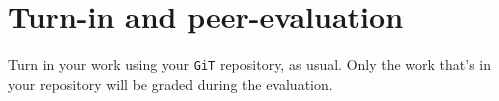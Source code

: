 \documentclass{42-en}
\begin{document}

\chapter{Turn-in and peer-evaluation}

    Turn in your work using your \texttt{GiT} repository, as
    usual. Only the work that's in your repository will be graded during
    the evaluation.



\end{document}
